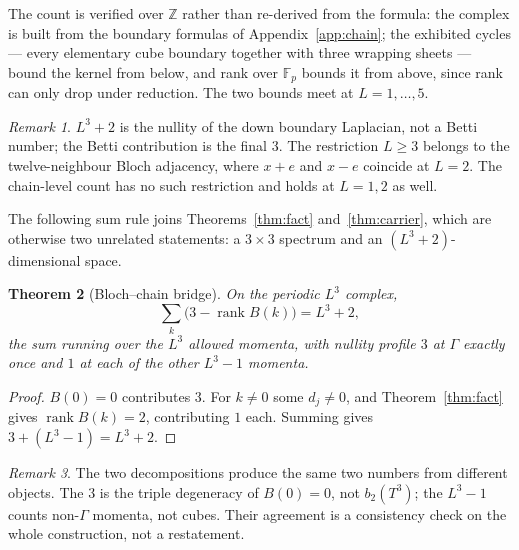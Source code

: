 \documentclass[11pt]{article}
\theoremstyle{plain}
\newtheorem{theorem}{Theorem}
\theoremstyle{definition}
\theoremstyle{remark}
\newtheorem{remark}[theorem]{Remark}
\newcommand{\chk}[1]{}
\begin{document}
The count is verified over $\mathbb{Z}$ rather than re-derived from the
formula: the complex is built from the boundary formulas of
Appendix~\ref{app:chain}; the exhibited cycles --- every elementary cube
boundary together with three wrapping sheets --- bound the kernel from below,
and rank over $\mathbb{F}_p$ bounds it from above, since rank can only drop
under reduction. The two bounds meet at $L=1,\dots,5$.
\chk{dim Z\_2 = L\^{}3 + 2 by rank, not by re-arranging the formula}
\chk{cube boundaries and three wrapping sheets SPAN Z\_2}

\begin{remark}
$L^3+2$ is the nullity of the down boundary Laplacian, not a Betti number; the
Betti contribution is the final $3$. The restriction $L\ge3$ belongs to the
twelve-neighbour Bloch adjacency, where $x+e$ and $x-e$ coincide at $L=2$. The
chain-level count has no such restriction and holds at $L=1,2$ as well.
\chk{the L\^{}3+2 count is chain-level, not the Bloch convention}
\end{remark}

The following sum rule joins Theorems~\ref{thm:fact} and~\ref{thm:carrier},
which are otherwise two unrelated statements: a $3\times3$ spectrum and an
$(L^3+2)$-dimensional space.

\begin{theorem}[Bloch--chain bridge]\label{thm:bridge}
On the periodic $L^3$ complex,
\[
  \sum_{k}\bigl(3-\operatorname{rank}B(k)\bigr)=L^3+2 ,
\]
the sum running over the $L^3$ allowed momenta, with nullity profile
$3$ at $\Gamma$ exactly once and $1$ at each of the other $L^3-1$ momenta.
\end{theorem}

\begin{proof}
$B(0)=0$ contributes $3$. For $k\neq0$ some $d_j\neq0$, and
Theorem~\ref{thm:fact} gives $\operatorname{rank}B(k)=2$, contributing $1$
each. Summing gives $3+(L^3-1)=L^3+2$.
\end{proof}
\chk{the Bloch and chain routes to the carrier agree}

\begin{remark}
The two decompositions produce the same two numbers from different objects.
The $3$ is the triple degeneracy of $B(0)=0$, not $b_2(T^3)$; the $L^3-1$
counts non-$\Gamma$ momenta, not cubes. Their agreement is a consistency check
on the whole construction, not a restatement.
\end{remark}
\end{document}
